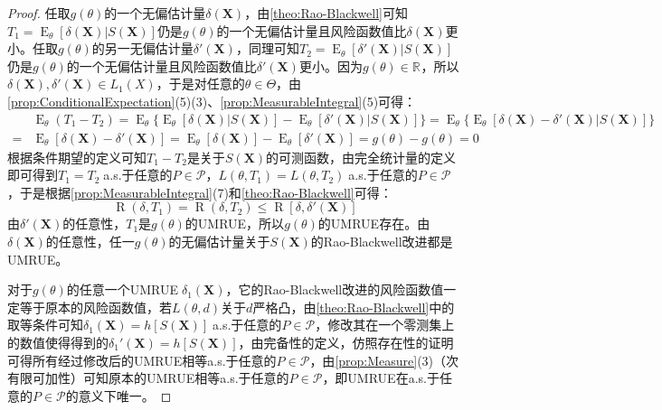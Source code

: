 \begin{proof}
	任取$g(\theta)$的一个无偏估计量$\delta(\mathbf{X})$，由\cref{theo:Rao-Blackwell}可知$T_1=\operatorname{E}_{\theta}[\delta(\mathbf{X})|S(\mathbf{X})]$仍是$g(\theta)$的一个无偏估计量且风险函数值比$\delta(\mathbf{X})$更小。任取$g(\theta)$的另一无偏估计量$\delta'(\mathbf{X})$，同理可知$T_2=\operatorname{E}_{\theta}[\delta'(\mathbf{X})|S(\mathbf{X})]$仍是$g(\theta)$的一个无偏估计量且风险函数值比$\delta'(\mathbf{X})$更小。因为$g(\theta)\in\mathbb{R}^{}$，所以$\delta(\mathbf{X}),\delta'(\mathbf{X})\in L_1(X)$，于是对任意的$\theta\in\Theta$，由\cref{prop:ConditionalExpectation}(5)(3)、\cref{prop:MeasurableIntegral}(5)可得：
	\begin{align*}
		&\operatorname{E}_{\theta}(T_1-T_2)=\operatorname{E}_{\theta}\{\operatorname{E}_{\theta}[\delta(\mathbf{X})|S(\mathbf{X})]-\operatorname{E}_{\theta}[\delta'(\mathbf{X})|S(\mathbf{X})]\}=\operatorname{E}_{\theta}\{\operatorname{E}_{\theta}[\delta(\mathbf{X})-\delta'(\mathbf{X})|S(\mathbf{X})]\} \\
		=&\operatorname{E}_{\theta}[\delta(\mathbf{X})-\delta'(\mathbf{X})]=\operatorname{E}_{\theta}[\delta(\mathbf{X})]-\operatorname{E}_{\theta}[\delta'(\mathbf{X})]=g(\theta)-g(\theta)=0
	\end{align*}
	根据条件期望的定义可知$T_1-T_2$是关于$S(\mathbf{X})$的可测函数，由完全统计量的定义即可得到$T_1=T_2\;$a.s.于任意的$P\in\mathscr{P}$，$L(\theta,T_1)=L(\theta,T_2)\;$a.s.于任意的$P\in\mathscr{P}$，于是根据\cref{prop:MeasurableIntegral}(7)和\cref{theo:Rao-Blackwell}可得：
	\begin{equation*}
		\operatorname{R}(\delta,T_1)=\operatorname{R}(\delta,T_2)\leqslant\operatorname{R}[\delta,\delta'(\mathbf{X})]
	\end{equation*}
	由$\delta'(\mathbf{X})$的任意性，$T_1$是$g(\theta)$的UMRUE，所以$g(\theta)$的UMRUE存在。由$\delta(\mathbf{X})$的任意性，任一$g(\theta)$的无偏估计量关于$S(\mathbf{X})$的Rao-Blackwell改进都是UMRUE。\par
	对于$g(\theta)$的任意一个UMRUE$\;\delta_1(\mathbf{X})$，它的Rao-Blackwell改进的风险函数值一定等于原本的风险函数值，若$L(\theta,d)$关于$d$严格凸，由\cref{theo:Rao-Blackwell}中的取等条件可知$\delta_1(\mathbf{X})=h[S(\mathbf{X})]\;$a.s.于任意的$P\in\mathscr{P}$，修改其在一个零测集上的数值使得得到的$\delta_1'(\mathbf{X})=h[S(\mathbf{X})]$，由完备性的定义，仿照存在性的证明可得所有经过修改后的UMRUE相等a.s.于任意的$P\in\mathscr{P}$，由\cref{prop:Measure}(3)（次有限可加性）可知原本的UMRUE相等a.s.于任意的$P\in\mathscr{P}$，即UMRUE在a.s.于任意的$P\in\mathscr{P}$的意义下唯一。
\end{proof}
